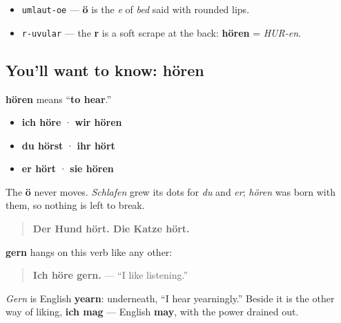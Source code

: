 \begin{sounds}
\begin{itemize}
\raggedright
  \item \texttt{umlaut-oe} — \textbf{ö} is the \emph{e} of \emph{bed} said with rounded lips.
  \item \texttt{r-uvular} — the \textbf{r} is a soft scrape at the back: \textbf{hören} = \emph{HUR-en}.
\end{itemize}
\end{sounds}

\subsection*{You'll want to know: hören}
\textbf{hören} means \textquotedblleft{}\textbf{to hear}.\textquotedblright{}

\begin{itemize}
\raggedright
  \item \textbf{ich höre} · \textbf{wir hören}
  \item \textbf{du hörst} · \textbf{ihr hört}
  \item \textbf{er hört} · \textbf{sie hören}
\end{itemize}

The \textbf{ö} never moves. \emph{Schlafen} grew its dots for \emph{du} and \emph{er}; \emph{hören} was born with them, so nothing is left to break.

\begin{quote}
\textbf{Der Hund hört. Die Katze hört.}
\end{quote}

\begin{grammarlens}[title={Grammar Lens: liking it, the Chapter 25 way}]
\textbf{gern} hangs on this verb like any other:

\begin{quote}
\textbf{Ich höre gern.} — \textquotedblleft{}I like listening.\textquotedblright{}
\end{quote}

\emph{Gern} is English \textbf{yearn}: underneath, \textquotedblleft{}I hear yearningly.\textquotedblright{} Beside it is the other way of liking, \textbf{ich mag} — English \textbf{may}, with the power drained out.
\end{grammarlens}

